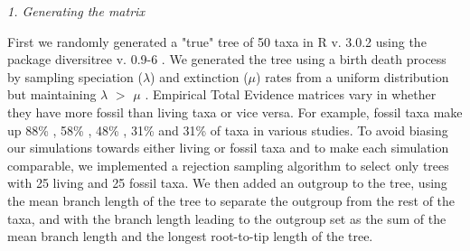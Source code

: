 \documentclass[12pt,letterpaper]{article}
\renewcommand{\subsection}[1]{%
\bigskip
\begin{center}
\begin{large}
\normalfont\itshape #1
\end{large}
\end{center}}
\begin{document}

\subsection{1. Generating the matrix}
\label{Generating_the_matrix}
First we randomly generated a "true" tree of 50 taxa in R v. 3.0.2 \citep{R302} using the package diversitree v. 0.9-6 \citep{fitzjohndiversitree2012}. We generated the tree using a birth death process by sampling speciation ($\lambda$) and extinction ($\mu$) rates from a uniform distribution but maintaining $\lambda$ $>$ $\mu$ \citep{paradistime-dependent2011}.
Empirical Total Evidence matrices vary in whether they have more fossil than living taxa or vice versa. For example, fossil taxa make up 88\% \citealt{beckancient2014}, 58\% \citealt{schragocombining2013}, 48\% \citealt{pyrondivergence2011}, 31\% \citealt{ronquista2012} and 31\% \citealt{slaterphylogenetic2013} of taxa in various studies. To avoid biasing our simulations towards either living or fossil taxa and to make each simulation comparable, we implemented a rejection sampling algorithm to select only trees with 25 living and 25 fossil taxa.
We then added an outgroup to the tree, using the mean branch length of the tree to separate the outgroup from the rest of the taxa, and with the branch length leading to the outgroup set as the sum of the mean branch length and the longest root-to-tip length of the tree.
\end{document}
